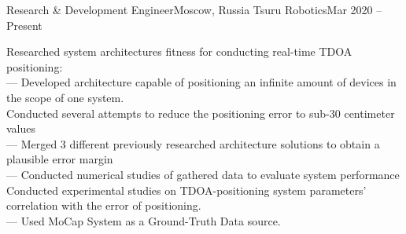\resumeSubheading
  {Research \& Development Engineer}{Moscow, Russia}
  {Tsuru Robotics}{Mar 2020 -- Present}
  \begin{itemize}[leftmargin=0in, label={}]
    \small{\item{
      {Researched system architectures fitness for conducting real-time TDOA positioning:}\\
      {— Developed architecture capable of positioning an infinite amount of devices in the scope of one system.}\\
      {Conducted several attempts to reduce the positioning error to sub-30 centimeter values}\\
      {— Merged 3 different previously researched architecture solutions to obtain a plausible error margin}\\
      {— Conducted numerical studies of gathered data to evaluate system performance}\\
      {Conducted experimental studies on TDOA-positioning system parameters' correlation with the error of positioning.}\\
      {— Used MoCap System as a Ground-Truth Data source.}\\
    }}
   \end{itemize}